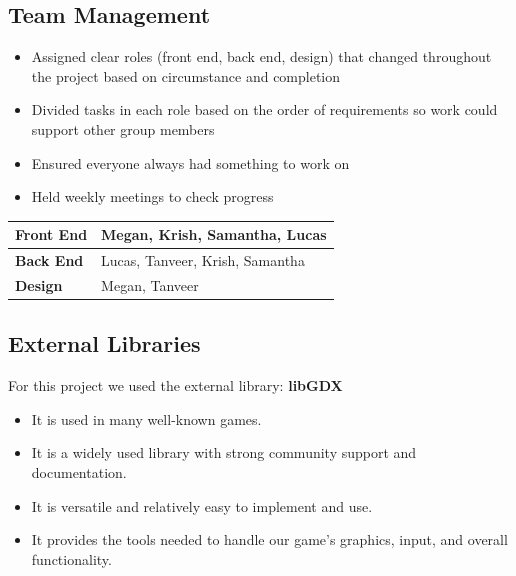 \documentclass[12pt]{article}
\begin{document}
\subsection{Team Management}

	\begin{itemize}
    \item Assigned clear roles (front end, back end, design) that changed throughout the project based on circumstance and completion
    \item Divided tasks in each role based on the order of requirements so work could support other group members
    \item Ensured everyone always had something to work on
    \item Held weekly meetings to check progress
	\end{itemize}
	
	\renewcommand{\arraystretch}{1.5}
	\setlength{\tabcolsep}{12pt}

	\begin{table}[H]
	\centering
	\begin{tabular}{|l|l|}
	\hline
	\textbf{Front End} & Megan, Krish, Samantha, Lucas \\ \hline
	\textbf{Back End} & Lucas, Tanveer, Krish, Samantha \\ \hline
	\textbf{Design} & Megan, Tanveer \\ \hline
	\end{tabular}
	\end{table}

\subsection{External Libraries}
For this project we used the external library: \textbf{libGDX}
\begin{itemize}
\item It is used in many well-known games.
\item It is a widely used library with strong community support and documentation.
\item It is versatile and relatively easy to implement and use.
\item It provides the tools needed to handle our game’s graphics, input, and overall functionality.
\end{itemize}
\end{document}
